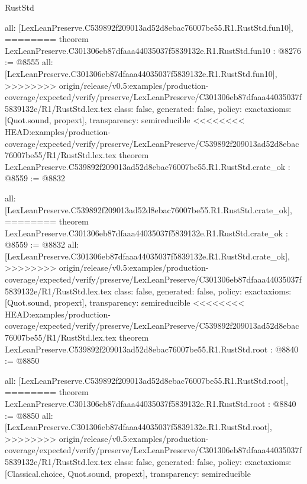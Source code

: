 \begin{lexlean}{RustStd}
\begin{coremodule}
{\begin{coremodule}
{{{{{{{{{{{{{  all: [LexLeanPreserve.C539892f209013ad52d8ebac76007be55.R1.RustStd.fun10],
========
theorem LexLeanPreserve.C301306eb87dfaaa44035037f5839132e.R1.RustStd.fun10 : @8276 := @8555 {
  all: [LexLeanPreserve.C301306eb87dfaaa44035037f5839132e.R1.RustStd.fun10],
>>>>>>>> origin/release/v0.5:examples/production-coverage/expected/verify/preserve/LexLeanPreserve/C301306eb87dfaaa44035037f5839132e/R1/RustStd.lex.tex
  class: false,
  generated: false,
  policy: exact{axioms: [Quot.sound, propext]},
  transparency: semireducible
}
<<<<<<<< HEAD:examples/production-coverage/expected/verify/preserve/LexLeanPreserve/C539892f209013ad52d8ebac76007be55/R1/RustStd.lex.tex
theorem LexLeanPreserve.C539892f209013ad52d8ebac76007be55.R1.RustStd.crate_ok : @8559 := @8832 {
  all: [LexLeanPreserve.C539892f209013ad52d8ebac76007be55.R1.RustStd.crate_ok],
========
theorem LexLeanPreserve.C301306eb87dfaaa44035037f5839132e.R1.RustStd.crate_ok : @8559 := @8832 {
  all: [LexLeanPreserve.C301306eb87dfaaa44035037f5839132e.R1.RustStd.crate_ok],
>>>>>>>> origin/release/v0.5:examples/production-coverage/expected/verify/preserve/LexLeanPreserve/C301306eb87dfaaa44035037f5839132e/R1/RustStd.lex.tex
  class: false,
  generated: false,
  policy: exact{axioms: [Quot.sound, propext]},
  transparency: semireducible
}
<<<<<<<< HEAD:examples/production-coverage/expected/verify/preserve/LexLeanPreserve/C539892f209013ad52d8ebac76007be55/R1/RustStd.lex.tex
theorem LexLeanPreserve.C539892f209013ad52d8ebac76007be55.R1.RustStd.root : @8840 := @8850 {
  all: [LexLeanPreserve.C539892f209013ad52d8ebac76007be55.R1.RustStd.root],
========
theorem LexLeanPreserve.C301306eb87dfaaa44035037f5839132e.R1.RustStd.root : @8840 := @8850 {
  all: [LexLeanPreserve.C301306eb87dfaaa44035037f5839132e.R1.RustStd.root],
>>>>>>>> origin/release/v0.5:examples/production-coverage/expected/verify/preserve/LexLeanPreserve/C301306eb87dfaaa44035037f5839132e/R1/RustStd.lex.tex
  class: false,
  generated: false,
  policy: exact{axioms: [Classical.choice, Quot.sound, propext]},
  transparency: semireducible
}

}}}}}}}}}}}}}}}
\end{coremodule}}
\end{coremodule}
\end{lexlean}
